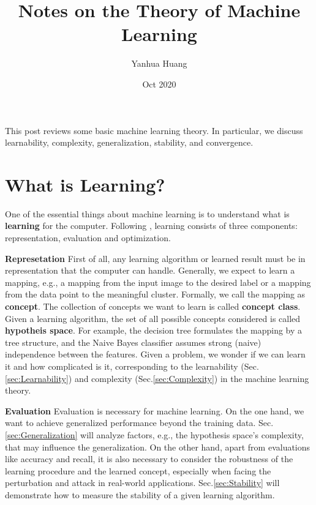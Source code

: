 \documentclass[a4paper,11pt]{article}
\begin{document}
\title{Notes on the Theory of Machine Learning}
\author{Yanhua Huang}
\date{Oct 2020}
\maketitle

This post reviews some basic machine learning theory. In particular, we discuss learnability, complexity, generalization, stability, and convergence.

\section{What is Learning?}

One of the essential things about machine learning is to understand what is \textbf{learning} for the computer. Following \citet{domingos2012few}, learning consists of three components: representation, evaluation and optimization.

\textbf{Represetation} First of all, any learning algorithm or learned result must be in representation that the computer can handle. Generally, we expect to learn a mapping, e.g., a mapping from the input image to the desired label or a mapping from the data point to the meaningful cluster. Formally, we call the mapping as \textbf{concept}. The collection of concepts we want to learn is called \textbf{concept class}. Given a learning algorithm, the set of all possible concepts considered is called \textbf{hypotheis space}. For example, the decision tree formulates the mapping by a tree structure, and the Naive Bayes classifier assumes strong (naive) independence between the features. Given a problem, we wonder if we can learn it and how complicated is it, corresponding to the learnability (Sec.\ref{sec:Learnability}) and complexity (Sec.\ref{sec:Complexity}) in the machine learning theory.

\textbf{Evaluation} Evaluation is necessary for machine learning. On the one hand, we want to achieve generalized performance beyond the training data. Sec.\ref{sec:Generalization} will analyze factors, e.g., the hypothesis space’s complexity, that may influence the generalization. On the other hand, apart from evaluations like accuracy and recall, it is also necessary to consider the robustness of the learning procedure and the learned concept, especially when facing the perturbation and attack in real-world applications. Sec.\ref{sec:Stability} will demonstrate how to measure the stability of a given learning algorithm.
\end{document}
